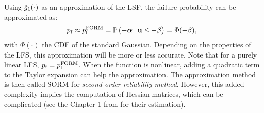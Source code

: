 Using $\check{g}_1(\cdot)$ as an approximation of the LSF, the failure probability can be approximated as: 
\begin{equation}
    p_\mathrm{f} \approx p_\mathrm{f}^{\mathrm{FORM}} = \mathbb{P}\left(- {\boldsymbol{\alpha}}^\top {\bf u} \leq -\beta\right) = \Phi(-\beta),
\end{equation} 
with $\Phi(\cdot)$ the CDF of the standard Gaussian. 
Depending on the properties of the LFS, this approximation will be more or less accurate. 
Note that for a purely linear LFS, $p_\mathrm{f} = p_\mathrm{f}^{\mathrm{FORM}}$. 
When the function is nonlinear, adding a quadratic term to the Taylor expansion can help the approximation. 
The approximation method is then called SORM for \textit{second order reliability method}. 
However, this added complexity implies the computation of Hessian matrices, which can be complicated (see the Chapter 1 from \citealt{bourinet_2018} for their estimation).


